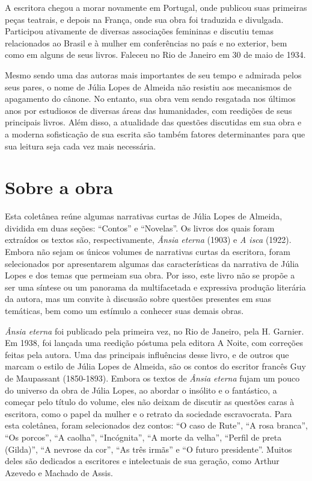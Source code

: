 A escritora chegou a morar novamente em Portugal, onde publicou suas
primeiras peças teatrais, e depois na França, onde sua obra foi
traduzida e divulgada. Participou ativamente de diversas associações
femininas e discutiu temas relacionados ao Brasil e à mulher em
conferências no país e no exterior, bem como em alguns de seus livros.
Faleceu no Rio de Janeiro em 30 de maio de 1934.

Mesmo sendo uma das autoras mais importantes de seu tempo e admirada
pelos seus pares, o nome de Júlia Lopes de Almeida não resistiu aos
mecanismos de apagamento do cânone. No entanto, sua obra vem sendo
resgatada nos últimos anos por estudiosos de diversas áreas das
humanidades, com reedições de seus principais livros. Além disso, a
atualidade das questões discutidas em sua obra e a moderna sofisticação
de sua escrita são também fatores determinantes para que sua leitura
seja cada vez mais necessária.

\section{Sobre a obra}

Esta coletânea reúne algumas narrativas curtas de Júlia Lopes de
Almeida, dividida em duas seções: ``Contos'' e ``Novelas''. Os livros
dos quais foram extraídos os textos são, respectivamente, \emph{Ânsia
eterna} (1903) e \emph{A isca} (1922). Embora não sejam os únicos
volumes de narrativas curtas da escritora, foram selecionados por
apresentarem algumas das características da narrativa de Júlia Lopes e
dos temas que permeiam sua obra. Por isso, este livro não se propõe a
ser uma síntese ou um panorama da multifacetada e expressiva produção
literária da autora, mas um convite à discussão sobre questões presentes
em suas temáticas, bem como um estímulo a conhecer suas demais obras.

\emph{Ânsia eterna} foi publicado pela primeira vez, no Rio de Janeiro,
pela H. Garnier. Em 1938, foi lançada uma reedição póstuma pela editora
A Noite, com correções feitas pela autora. Uma das principais
influências desse livro, e de outros que marcam o estilo de Júlia Lopes
de Almeida, são os contos do escritor francês Guy de Maupassant
(1850-1893). Embora os textos de \emph{Ânsia eterna} fujam um pouco do
universo da obra de Júlia Lopes, ao abordar o insólito e o fantástico, a
começar pelo título do volume, eles não deixam de discutir as questões
caras à escritora, como o papel da mulher e o retrato da sociedade
escravocrata. Para esta coletânea, foram selecionados dez contos: ``O
caso de Rute'', ``A rosa branca'', ``Os porcos'', ``A caolha'',
``Incógnita'', ``A morte da velha'', ``Perfil de preta (Gilda)'', ``A
nevrose da cor'', ``As três irmãs'' e ``O futuro presidente''. Muitos
deles são dedicados a escritores e intelectuais de sua geração, como
Arthur Azevedo e Machado de Assis.

